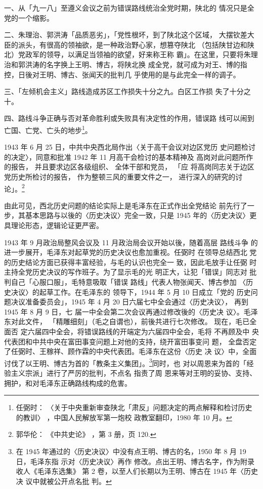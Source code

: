 一、从「九一八」至遵义会议之前为错误路线统治全党时期，陕北的
情况只是全党的一个缩影。

二、朱理治、郭洪涛「品质恶劣」，「党性根坏，到了陕北这个区域，
大摆钦差大臣的派头，有很高的领袖欲，是一种政治野心家，想篡夺陕北
（包括陕甘边和陕北）党政军的领导，以满足当领袖的欲望，好来称王称
霸」。在这里，只要将朱理治和郭洪涛的名字换上王明、博古，将陕北换
成全党，就可成为对王、博的指控，日後对王明、博古、张闻天的批判几
乎使用的是与此完全一样的调子。

三、「左倾机会主义」路线造成苏区工作损失十分之九。白区工作损
失了十分之十。

四、路线斗争正确与否对革命胜利或失败具有决定性的作用，错误路
线可以闹到亡国、亡党、亡头的地步\footnote{任弼时：
〈关于中央重新审查陕北「肃反」问题决定的两点解释和检讨历史的教训〉
，中国人民解放军第一炮校
政教室翻印，1980 年 10 月。
}。

1943 年 6 月 25 日，中共中央西北局作出〈关于高干会议对边区党历
史问题检讨的决定〉，同意和批准 1942 年 11 月高干会检讨的基本精神及
高岗对此问题所作的报告，
并且要求边区各级组织、
全体干部和党员，
「应
将高岗同志关于边区党历史所检讨的报告，
作为整顿三风的重要文件之一，
进行深入的研究的讨论」。\footnote{ 郭华伦：
《中共史论》
，第 3 册，页 120.}

由此可见，西北历史问题的结论实际上是毛泽东在正式作出全党结论
前先行了一步，其基本思路与以後的〈历史决议〉完全一致，只是 1945
年的〈历史决议〉更具理论形态，逻辑论证更严密。

1943 年 9 月政治局整风会议及 11 月政治局会议开始以後，随着高层 路线斗争
的进一步展开，毛泽东对起草党的历史决议也愈加重视。任弼时 在领导总结西北
党的历史结论方面已获得丰富经验，与毛的认识也完全一 致，因此毛放手让任弼
时主持全党历史决议的写作班子。为了显示毛的光 明正大，让犯「错误」同志对
批判自己「心服口服」，毛特意吸取「错误 路线」代表人物张闻天、博古参加
〈历史决议〉的起草工作。在毛泽东的 领导下，1944 年 5 月 10 日成立「党的
历史问题决议准备委员会」，1945 年 4 月 20 日六届七中全会通过〈历史决议〉，
再到 1945 年 8 月 9 日，七 届一中全会第二次会议再通过修改後的〈历史决
议〉。毛泽东对此文件， 「精雕细刻」（毛之自谓也），前後共进行七次修改。
现在，毛已全面否 定六届四中全会，将错误路线的开端定为六届四中全会，毛将
不再顾及中 央代表团和中共中央在富田事变问题上对他的支持，绕开富田事变问
题， 全盘否定了任弼时、王稼祥、顾作霖的中央代表团。毛泽东在这份〈历史 决
议〉中，全面讨伐了以王明、博古为首的「教条主义集团」。\footnote{在 1945
年通过的〈历史决议〉中没有点王明、博古的名，1950 年 8 月 19 日，毛泽东指
示对〈历史决议〉再作 修改。点出王明、博古名字，作为附录收人《毛泽东选集》
第 2 卷，以至人们长期以为王明、博古在 1945 年〈历史决 议中就被公开点名批
判。}同时，也 对以周恩来为首的「经验主义宗派」进行了严厉的批判，不点名
指责了周 恩来等对王明的妥协、支持、拥护，和对毛泽东正确路线构成的危害。

